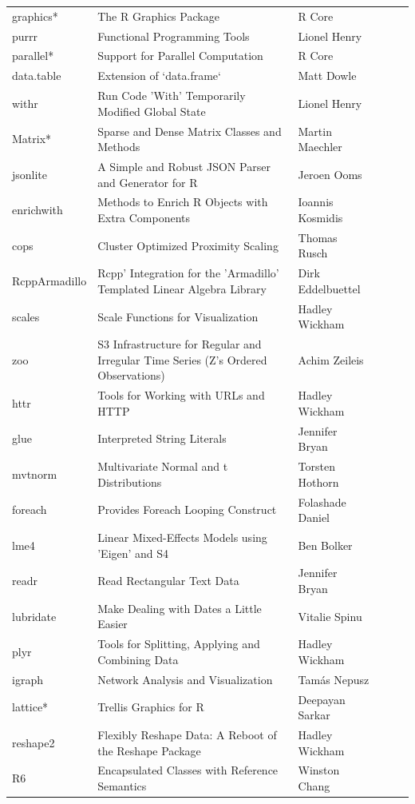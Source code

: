 \begin{table}[h]
\begin{center}
{\begin{tabular}{llllll}
 graphics* & The R Graphics Package &  R Core \\
 purrr & Functional Programming Tools & Lionel Henry \\
 parallel* & Support for Parallel Computation & R Core \\
 data.table & Extension of `data.frame` & Matt Dowle \\
 withr & Run Code 'With' Temporarily Modified Global State & Lionel Henry \\
 Matrix* & Sparse and Dense Matrix Classes and Methods & Martin Maechler \\
 jsonlite & A Simple and Robust JSON Parser and Generator for R & Jeroen Ooms \\
 enrichwith & Methods to Enrich R Objects with Extra Components & Ioannis Kosmidis \\
 cops & Cluster Optimized Proximity Scaling & Thomas Rusch \\
 RcppArmadillo & Rcpp' Integration for the 'Armadillo' Templated Linear Algebra Library & Dirk Eddelbuettel \\
 scales & Scale Functions for Visualization & Hadley Wickham \\
 zoo & S3 Infrastructure for Regular and Irregular Time Series (Z's Ordered Observations) & Achim Zeileis \\
 httr & Tools for Working with URLs and HTTP & Hadley Wickham \\
 glue & Interpreted String Literals & Jennifer Bryan \\
 mvtnorm & Multivariate Normal and t Distributions & Torsten Hothorn \\
 foreach & Provides Foreach Looping Construct & Folashade Daniel \\
 lme4 & Linear Mixed-Effects Models using 'Eigen' and S4 & Ben Bolker \\
 readr & Read Rectangular Text Data & Jennifer Bryan \\
 lubridate & Make Dealing with Dates a Little Easier & Vitalie Spinu \\
 plyr & Tools for Splitting, Applying and Combining Data & Hadley Wickham \\
 igraph & Network Analysis and Visualization & Tamás Nepusz \\
 lattice* & Trellis Graphics for R & Deepayan Sarkar \\
 reshape2 & Flexibly Reshape Data: A Reboot of the Reshape Package & Hadley Wickham \\
 R6 & Encapsulated Classes with Reference Semantics & Winston Chang \\

\end{tabular}}
\end{center}
\end{table}
